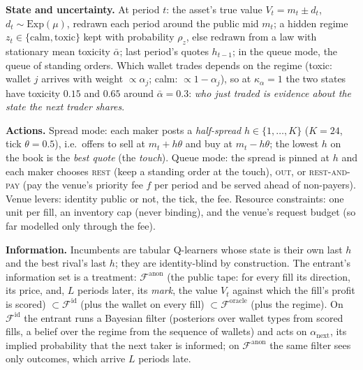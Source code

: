 \documentclass[10pt]{article}
\newcommand{\Fanon}{\mathcal{F}^{\mathrm{anon}}}
\newcommand{\Fid}{\mathcal{F}^{\mathrm{id}}}
\newcommand{\For}{\mathcal{F}^{\mathrm{oracle}}}
\begin{document}
\textbf{State and uncertainty.} At period $t$: the asset's true value $V_t=m_t\pm d_t$, $d_t\sim\mathrm{Exp}(\mu)$, redrawn each period around the public mid $m_t$; a hidden regime $z_t\in\{\text{calm},\text{toxic}\}$ kept with probability $\rho_z$, else redrawn from a law with stationary mean toxicity $\bar\alpha$; last period's quotes $h_{t-1}$; in the queue mode, the queue of standing orders. Which wallet trades depends on the regime (toxic: wallet $j$ arrives with weight $\propto\alpha_j$; calm: $\propto1-\alpha_j$), so at $\kappa_\alpha=1$ the two states have toxicity $0.15$ and $0.65$ around $\bar\alpha=0.3$: \emph{who just traded is evidence about the state the next trader shares}.

\textbf{Actions.} Spread mode: each maker posts a \emph{half-spread} $h\in\{1,\dots,K\}$ ($K=24$, tick $\theta=0.5$), i.e.\ offers to sell at $m_t+h\theta$ and buy at $m_t-h\theta$; the lowest $h$ on the book is the \emph{best quote} (the \emph{touch}). Queue mode: the spread is pinned at $h$ and each maker chooses \textsc{rest} (keep a standing order at the touch), \textsc{out}, or \textsc{rest-and-pay} (pay the venue's priority fee $f$ per period and be served ahead of non-payers). Venue levers: identity public or not, the tick, the fee. Resource constraints: one unit per fill, an inventory cap (never binding), and the venue's request budget (so far modelled only through the fee).

\textbf{Information.} Incumbents are tabular Q-learners whose state is their own last $h$ and the best rival's last $h$; they are identity-blind by construction. The entrant's information set is a treatment: $\Fanon$ (the public tape: for every fill its direction, its price, and, $L$ periods later, its \emph{mark}, the value $V_t$ against which the fill's profit is scored) $\subset\Fid$ (plus the wallet on every fill) $\subset\For$ (plus the regime). On $\Fid$ the entrant runs a Bayesian filter (posteriors over wallet types from scored fills, a belief over the regime from the sequence of wallets) and acts on $\alpha_{\mathrm{next}}$, its implied probability that the next taker is informed; on $\Fanon$ the same filter sees only outcomes, which arrive $L$ periods late.
\end{document}
